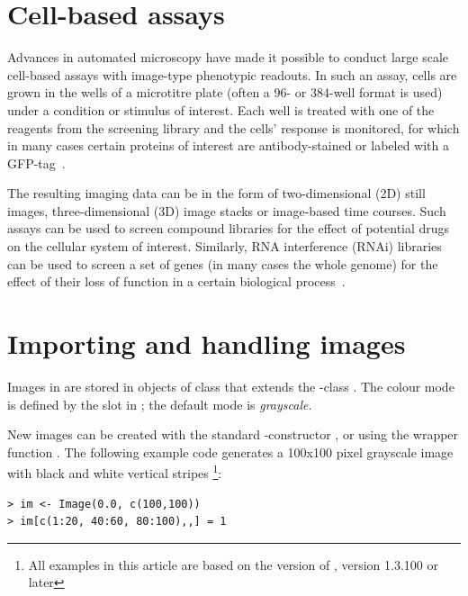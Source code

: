 \section*{Cell-based assays}

Advances in automated microscopy have made it possible to conduct large scale cell-based assays with image-type phenotypic readouts. In such an assay, cells are grown in the wells of a microtitre plate (often a 96- or 384-well format is used) under a condition or stimulus of interest. Each well is treated with one of the reagents from the screening library and the cells' response is monitored, for which in many cases certain proteins of interest are antibody-stained or labeled with a GFP-tag~\citep{CarpenterSabatini2004, Wiemann2004, MoffatSabatini2006, R:Neumann:2006}.

The resulting imaging data can be in the form of two-dimensional (2D) still images, three-dimensional (3D) image stacks or image-based time courses. Such assays can be used to screen compound libraries for the effect of potential drugs on the cellular system of interest. Similarly, RNA interference (RNAi) libraries can be used to screen a set of genes (in many cases the whole genome) for the effect of their loss of function in a certain biological process~\citep{R:Boutros:2004}.

\section*{Importing and handling images}

Images in  are stored in objects of class  that extends the \R{}-class . The colour mode is defined by the slot  in ; the default mode is {\em grayscale}.

New images can be created with the standard \R{}-constructor , or using the wrapper function . The following example code generates a \normalfont\textsf{100x100} pixel grayscale image with black and white vertical stripes \footnote{All examples in this article are based on the  version of , version 1.3.100 or later}:

\begin{verbatim}
> im <- Image(0.0, c(100,100))
> im[c(1:20, 40:60, 80:100),,] = 1
\end{verbatim}

